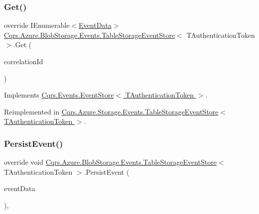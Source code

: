 \subsubsection{\texorpdfstring{Get()}{Get()}\hspace{0.1cm}{\footnotesize\ttfamily [2/2]}}
{\footnotesize\ttfamily override I\+Enumerable$<$\hyperlink{classCqrs_1_1Events_1_1EventData}{Event\+Data}$>$ \hyperlink{classCqrs_1_1Azure_1_1BlobStorage_1_1Events_1_1TableStorageEventStore}{Cqrs.\+Azure.\+Blob\+Storage.\+Events.\+Table\+Storage\+Event\+Store}$<$ T\+Authentication\+Token $>$.Get (\begin{DoxyParamCaption}\item[{Guid}]{correlation\+Id }\end{DoxyParamCaption})\hspace{0.3cm}{\ttfamily [virtual]}}



Implements \hyperlink{classCqrs_1_1Events_1_1EventStore_a0096646f5dff730b0041b9469719c420_a0096646f5dff730b0041b9469719c420}{Cqrs.\+Events.\+Event\+Store$<$ T\+Authentication\+Token $>$}.



Reimplemented in \hyperlink{classCqrs_1_1Azure_1_1Storage_1_1Events_1_1TableStorageEventStore_a1b436bbb111b14b85ee6ba7f90fb1a35_a1b436bbb111b14b85ee6ba7f90fb1a35}{Cqrs.\+Azure.\+Storage.\+Events.\+Table\+Storage\+Event\+Store$<$ T\+Authentication\+Token $>$}.

\mbox{\label{classCqrs_1_1Azure_1_1BlobStorage_1_1Events_1_1TableStorageEventStore_ae63921d0ace265b1b269c865080b5712_ae63921d0ace265b1b269c865080b5712}} 
\subsubsection{\texorpdfstring{Persist\+Event()}{PersistEvent()}}
{\footnotesize\ttfamily override void \hyperlink{classCqrs_1_1Azure_1_1BlobStorage_1_1Events_1_1TableStorageEventStore}{Cqrs.\+Azure.\+Blob\+Storage.\+Events.\+Table\+Storage\+Event\+Store}$<$ T\+Authentication\+Token $>$.Persist\+Event (\begin{DoxyParamCaption}\item[{\hyperlink{classCqrs_1_1Events_1_1EventData}{Event\+Data}}]{event\+Data }\end{DoxyParamCaption})\hspace{0.3cm}{\ttfamily [protected]}, {\ttfamily [virtual]}}




